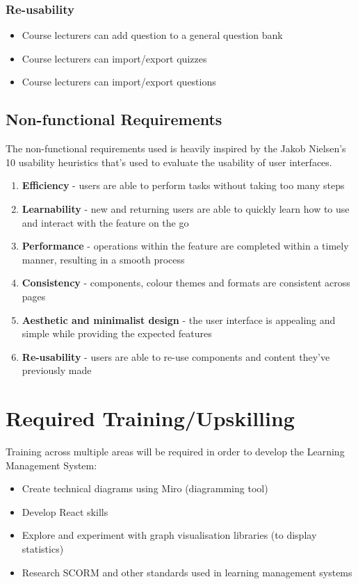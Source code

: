 \subsubsection{Re-usability}
\begin{itemize}
	\item Course lecturers can add question to a general question bank
	\item Course lecturers can import/export quizzes
	\item Course lecturers can import/export questions
\end{itemize}


\subsection{Non-functional Requirements}
The non-functional requirements used is heavily inspired by the Jakob Nielsen's 10 usability heuristics that's used to evaluate the usability of user interfaces. 

\begin{enumerate}
	\item \textbf{Efficiency} - users are able to perform tasks without taking too many steps
	\item \textbf{Learnability} - new and returning users are able to quickly learn how to use and interact with the feature on the go
	\item \textbf{Performance} - operations within the feature are completed within a timely manner, resulting in a smooth process
	\item \textbf{Consistency} - components, colour themes and formats are consistent across pages 
	\item \textbf{Aesthetic and minimalist design} - the user interface is appealing and simple while providing the expected features
	\item \textbf{Re-usability} - users are able to re-use components and content they've previously made
\end{enumerate}


\section{Required Training/Upskilling}
Training across multiple areas will be required in order to develop the Learning Management System:

\begin{itemize}
	\item Create technical diagrams using Miro (diagramming tool)
	\item Develop React skills
	\item Explore and experiment with graph visualisation libraries (to display statistics)
	\item Research SCORM and other standards used in learning management systems
\end{itemize}


